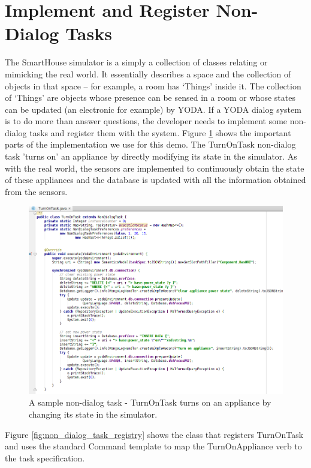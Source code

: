 \documentclass[titlepage]{article}
\begin{document}
\section{Implement and Register Non-Dialog Tasks}

The SmartHouse simulator is a simply a collection of classes relating or mimicking the real world. It essentially describes a space and the collection of objects in that space – for example, a room has ‘Things’ inside it.  The collection of ‘Things’ are objects whose presence can be sensed in a room or whose states can be updated (an electronic for example) by YODA.
If a YODA dialog system is to do more than answer questions, the developer needs to implement some non-dialog tasks and register them with the system. Figure \ref{fig:turn_on_task} shows the important parts of the implementation we use for this demo. The TurnOnTask non-dialog task 'turns on' an appliance by directly modifying its state in the simulator. As with the real world, the sensors are implemented to continuously obtain the state of these appliances and the database is updated with all the information obtained from the sensors.


\begin{figure}[htbp!]
\centering
\includegraphics[width=\textwidth]{TurnOnTask}
\caption{A sample non-dialog task - TurnOnTask turns on an appliance by changing its state in the simulator.}
\label{fig:turn_on_task}
\end{figure}

Figure \ref{fig:non_dialog_task_registry} shows the class that registers TurnOnTask and uses the standard Command template to map the TurnOnAppliance verb to the task specification.
\end{document}
